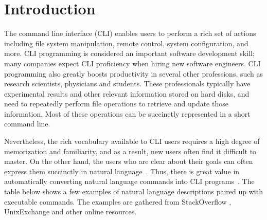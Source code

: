 \section{Introduction}


The command line interface (CLI) enables users to perform a rich set of actions including file system manipulation, remote control, system configuration, and more. CLI programming is considered an important software development skill; many companies expect CLI proficiency when hiring new software engineers. CLI programming also greatly boosts productivity in several other professions, such as research scientists, physicians and students. These professionals typically have experimental results and other relevant information stored on hard disks, and need to repeatedly perform file operations to retrieve and update those information. Most of these operations can be succinctly represented in a short command line.

Nevertheless, the rich vocabulary available to CLI users requires a high degree of memorization and familiarity, and as a result, new users often find it difficult to master. On the other hand, %
the users who are clear about their goals can often express them succinctly in natural language~\cite{Myers:2004:NPL:1015864.1015888}. Thus, there is great value in automatically converting natural language commands into CLI programs~\cite{Pederson-Report,zoltan1991get,Manaris:1994:DNL:198125.198137}. The table below shows a few examples of natural language descriptions paired up with executable commands. The examples are gathered from StackOverflow
, UnixExchange 
and other online resources.

